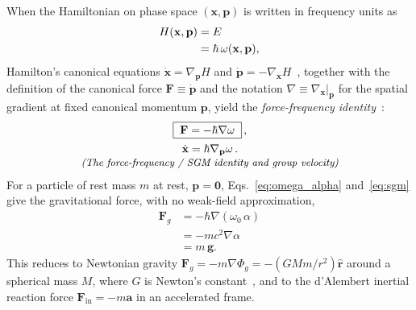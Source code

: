 \documentclass[aps,prd,onecolumn,tightenlines,nofootinbib,notitlepage,11pt,floatfix]{revtex4-2}
\theoremstyle{indentedtheorem}
\begin{document}
When the Hamiltonian on phase space $(\mathbf{x},\mathbf{p})$ is written in frequency units as
\begin{align}
    H(\mathbf{x},\mathbf{p}) &= E \notag\\
    &= \hbar\,\omega(\mathbf{x},\mathbf{p}) ,
    \label{eq:H_eq_hw}
\end{align}
Hamilton's canonical equations $\dot{\mathbf{x}} = \nabla_{\mathbf{p}}H$ and $\dot{\mathbf{p}} = -\nabla_{\mathbf{x}}H$~\citep{Hamilton1835Second,Goldstein2002Classical}, together with the definition of the canonical force $\mathbf{F} \equiv \dot{\mathbf{p}}$ and the notation $\nabla \equiv \nabla_{\mathbf{x}}|_{\mathbf{p}}$ for the spatial gradient at fixed canonical momentum $\mathbf{p}$, yield the \emph{force-frequency identity}~\citep{HutchisonSGM2026}:
\begin{equation}
    \begin{gathered}
    \boxed{\; \mathbf{F} = -\hbar\nabla\omega \;} \, , \\
    \dot{\mathbf{x}} = \hbar\nabla_{\mathbf{p}}\omega \, . \\[-3pt]
    \text{\small\itshape (The force-frequency / SGM identity and group velocity)}
    \end{gathered}
    \label{eq:sgm}
\end{equation}
For a particle of rest mass $m$ at rest, $\mathbf{p}=\mathbf{0}$, Eqs.~\eqref{eq:omega_alpha} and~\eqref{eq:sgm} give the gravitational force, with no weak-field approximation,
\begin{align}
    \mathbf{F}_g &= -\hbar\nabla(\omega_0\,\alpha) \nonumber \\
    &= -mc^2\nabla\alpha \nonumber \\
    &= m\,\mathbf{g} .
    \label{eq:geometric_force}
\end{align}
This reduces to Newtonian gravity $\mathbf{F}_g = -m\nabla\Phi_g = -(GMm/r^2)\hat{\mathbf{r}}$ around a spherical mass $M$, where $G$ is Newton's constant~\citep{Newton1687Philosophiae}, and to the d'Alembert inertial reaction force $\mathbf{F}_\text{in} = -m\mathbf{a}$ in an accelerated frame.
\end{document}
